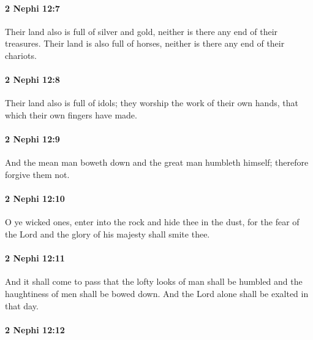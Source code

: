 		\paragraph{2 Nephi 12:7} %
			\label{2NEPHI-12-7}

			Their land also is full of silver and gold,
			neither is there any end of their treasures.
			Their land is also full of horses,
			neither is there any end of their chariots.

		\paragraph{2 Nephi 12:8} %
			\label{2NEPHI-12-8}

			Their land also is full of idols;
			they worship the work of their own hands,
			that which their own fingers have made.

		\paragraph{2 Nephi 12:9} %
			\label{2NEPHI-12-9}

			And the mean man boweth down
			and the great man humbleth himself;
			therefore forgive them not.

		\paragraph{2 Nephi 12:10} %
			\label{2NEPHI-12-10}

			O ye wicked ones, enter into the rock and hide thee in the dust,
			for the fear of the Lord and the glory of his majesty shall smite thee.

		\paragraph{2 Nephi 12:11} %
			\label{2NEPHI-12-11}

			And it shall come to pass that the lofty looks of man shall be humbled
			and the haughtiness of men shall be bowed down.
			And the Lord alone shall be exalted in that day.

		\paragraph{2 Nephi 12:12} %
			\label{2NEPHI-12-12}

